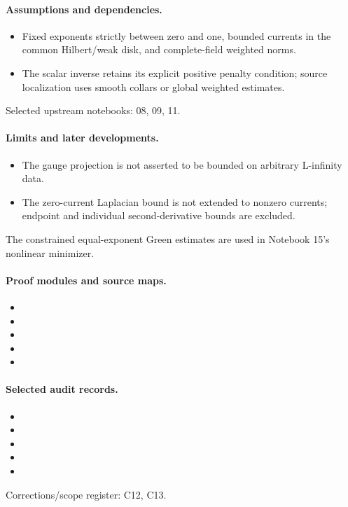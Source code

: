 \documentclass[11pt]{article}
\theoremstyle{remark}
\begin{document}
\paragraph{Assumptions and dependencies.}
\begin{itemize}
\item Fixed exponents strictly between zero and one, bounded currents in the common Hilbert/weak disk, and complete-field weighted norms.
\item The scalar inverse retains its explicit positive penalty condition; source localization uses smooth collars or global weighted estimates.
\end{itemize}

Selected upstream notebooks: 08, 09, 11.\par

\paragraph{Limits and later developments.}
\begin{itemize}
\item The gauge projection is not asserted to be bounded on arbitrary L-infinity data.
\item The zero-current Laplacian bound is not extended to nonzero currents; endpoint and individual second-derivative bounds are excluded.
\end{itemize}

The constrained equal-exponent Green estimates are used in Notebook 15's nonlinear minimizer.

\paragraph{Proof modules and source maps.}
\begingroup\small
\begin{itemize}
\item {}
\item {}
\item {}
\item {}
\item {}
\end{itemize}
\endgroup

\paragraph{Selected audit records.}
\begingroup\small
\begin{itemize}
\item {}
\item {}
\item {}
\item {}
\item {}
\end{itemize}
\endgroup
Corrections/scope register: C12, C13.\par
\end{document}
